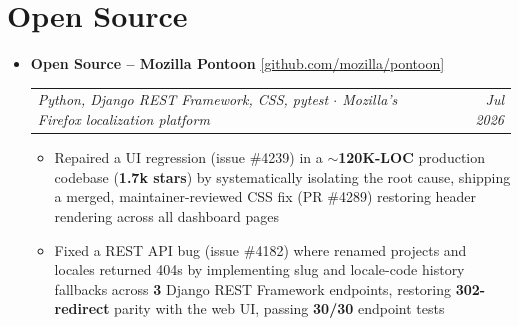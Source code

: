 \documentclass[10pt,letterpaper]{article}
\makeatletter
\newcommand{\resumeProjectHeading}[5]{%
  \vspace{5pt}%
  \item[]%
    {\small \textbf{#1} \enspace \href{#5}{\textcolor{accentblue}{[\underline{#2}]}}}\\[2pt]%
    {\small \begin{tabular*}{0.99\textwidth}{l@{\extracolsep{\fill}}r}%
      \textcolor{midgray}{\textit{\hspace{2pt}#3}} & \textcolor{midgray}{\textit{#4}}%
    \end{tabular*}}%
  \vspace{3pt}%
}
\newcommand{\resumeItem}[1]{
  \item {\small #1}
}
\makeatother
\begin{document}
\section{Open Source}
\begin{itemize}[leftmargin=0in, label={}]

  \resumeProjectHeading
    {Open Source -- Mozilla Pontoon}{github.com/mozilla/pontoon}
    {Python, Django REST Framework, CSS, pytest \enspace $\cdot$ \enspace Mozilla's Firefox localization platform}
    {Jul 2026}
    {https://github.com/mozilla/pontoon/pulls/eshu3104}
  \begin{itemize}
    \resumeItem{Repaired a UI regression (issue \#4239) in a \textbf{$\sim$120K-LOC} production codebase (\textbf{1.7k stars}) by systematically isolating the root cause, shipping a merged, maintainer-reviewed CSS fix (PR \#4289) restoring header rendering across all dashboard pages}
    \resumeItem{Fixed a REST API bug (issue \#4182) where renamed projects and locales returned 404s by implementing slug and locale-code history fallbacks across \textbf{3} Django REST Framework endpoints, restoring \textbf{302-redirect} parity with the web UI, passing \textbf{30/30} endpoint tests}
  \end{itemize}

\end{itemize}

\end{document}
